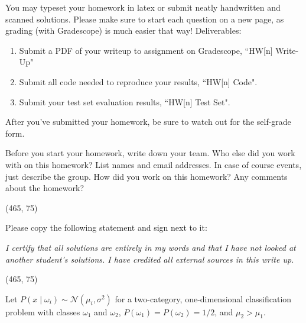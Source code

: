 
You may typeset your homework in latex or submit neatly handwritten and scanned solutions. Please make sure to start each question on a new page, as grading (with Gradescope) is much easier that way! Deliverables:

\begin{enumerate}
  \item Submit a PDF of your writeup to assignment on Gradescope, ``HW[n] Write-Up"
  \item Submit all code needed to reproduce your results, ``HW[n] Code".
  \item Submit your test set evaluation results, ``HW[n] Test Set".
\end{enumerate}

After you've submitted your homework, be sure to watch out for the self-grade form.

\begin{Parts}

\Part Before you start your homework, write down your team. Who else did you work with on this homework? List names and email addresses. In case of course events, just describe the group. How did you work on this homework? Any comments about the homework?

\vspace{15pt}
\framebox(465, 75){}

\Part Please copy the following statement and sign next to it:

\textit{I certify that all solutions are entirely in my words and that I have not looked at another student's solutions. I have credited all external sources in this write up.}

\vspace{15pt}
\framebox(465, 75){}

\end{Parts}

\pagebreak


Let $P(x \mid \omega_i) \sim \mathcal{N}(\mu_i,\sigma^2)$ for
a two-category, one-dimensional classification problem with
classes $\omega_{1}$ and $\omega_{2}$,
$P(\omega_1)=P(\omega_2)=1/2$, and $\mu_{2} > \mu_{1}$.

